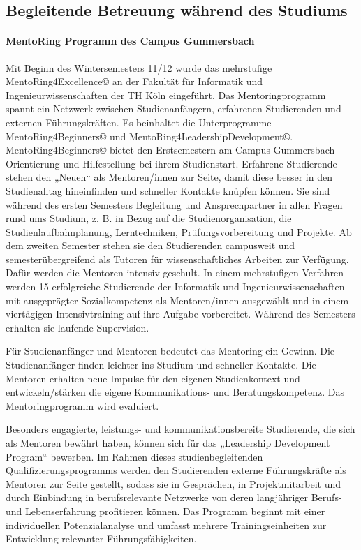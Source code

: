 \subsection{Begleitende Betreuung während des
Studiums}\label{begleitende-betreuung-wuxe4hrend-des-studiums}

\paragraph{MentoRing Programm des Campus
Gummersbach}\label{mentoring-programm-des-campus-gummersbach}

Mit Beginn des Wintersemesters 11/12 wurde das mehrstufige
MentoRing4Excellence© an der Fakultät für Informatik und
Ingenieurwissenschaften der TH Köln eingeführt. Das Mentoringprogramm
spannt ein Netzwerk zwischen Studienanfängern, erfahrenen Studierenden
und externen Führungskräften. Es beinhaltet die Unterprogramme
MentoRing4Beginners© und MentoRing4LeadershipDevelopment©.
MentoRing4Beginners© bietet den Erstsemestern am Campus Gummersbach
Orientierung und Hilfestellung bei ihrem Studienstart. Erfahrene
Studierende stehen den „Neuen`` als Mentoren/innen zur Seite, damit
diese besser in den Studienalltag hineinfinden und schneller Kontakte
knüpfen können. Sie sind während des ersten Semesters Begleitung und
Ansprechpartner in allen Fragen rund ums Studium, z. B. in Bezug auf die
Studienorganisation, die Studienlaufbahnplanung, Lerntechniken,
Prüfungsvorbereitung und Projekte. Ab dem zweiten Semester stehen sie
den Studierenden campusweit und semesterübergreifend als Tutoren für
wissenschaftliches Arbeiten zur Verfügung. Dafür werden die Mentoren
intensiv geschult. In einem mehrstufigen Verfahren werden 15
erfolgreiche Studierende der Informatik und Ingenieurwissenschaften mit
ausgeprägter Sozialkompetenz als Mentoren/innen ausgewählt und in einem
viertägigen Intensivtraining auf ihre Aufgabe vorbereitet. Während des
Semesters erhalten sie laufende Supervision.

Für Studienanfänger und Mentoren bedeutet das Mentoring ein Gewinn. Die
Studienanfänger finden leichter ins Studium und schneller Kontakte. Die
Mentoren erhalten neue Impulse für den eigenen Studienkontext und
entwickeln/stärken die eigene Kommunikations- und Beratungskompetenz.
Das Mentoringprogramm wird evaluiert.

Besonders engagierte, leistungs- und kommunikationsbereite Studierende,
die sich als Mentoren bewährt haben, können sich für das „Leadership
Development Program`` bewerben. Im Rahmen dieses studienbegleitenden
Qualifizierungsprogramms werden den Studierenden externe Führungskräfte
als Mentoren zur Seite gestellt, sodass sie in Gesprächen, in
Projektmitarbeit und durch Einbindung in berufsrelevante Netzwerke von
deren langjähriger Berufs- und Lebenserfahrung profitieren können. Das
Programm beginnt mit einer individuellen Potenzialanalyse und umfasst
mehrere Trainingseinheiten zur Entwicklung relevanter
Führungsfähigkeiten.

